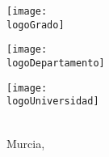 \begin{titlepage}
	\noindent\hspace*{\centeroffset}
	\begin{minipage}{\textwidth}
		\centering
		\noindent\hspace*{\centeroffset}
		\begin{center}
			{\texttt{[image: \\logoGrado]}}\\
			{\raggedleft\miGrado}
		\end{center}
		\vspace*{2em}
		\centering
		\noindent\hspace*{\centeroffset}
		\begin{minipage}[l]{6cm}
			\texttt{[image: \\logoDepartamento]}
		\end{minipage}
		\begin{minipage}[r]{6cm}
			\texttt{[image: \\logoUniversidad]}
		\end{minipage}
		\\[1cm]
		Murcia, \Hoy
	\end{minipage}


\end{titlepage}

\restoregeometry


